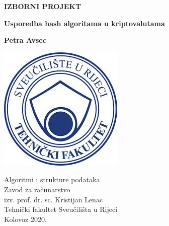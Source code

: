 \documentclass[12pt]{article}
\begin{document}
\begin{titlepage}
	\begin{center}
		\vspace*{1cm}
		
		\LARGE
		\textbf{IZBORNI PROJEKT} 
		
		\vspace{0.5cm}
		\LARGE
		\textbf{Usporedba hash algoritama u kriptovalutama} 
		
		\vspace{1.5cm}
		
		\Large
		\textbf{Petra Avsec}
		
		\vfill
		
		\textsl{}
		\vspace{0.8cm}
		
		\includegraphics[scale=0.5,keepaspectratio]{slike/riteh}
		
		\Large
		Algoritmi i strukture podataka \\
		Zavod za računarstvo\\
		izv. prof. dr. sc. Kristijan Lenac \\
		Tehnički fakultet Sveučilišta u Rijeci \\
		Kolovoz 2020. 
		
		
	\end{center}
\end{titlepage}

\tableofcontents

\pagebreak
\end{document}
